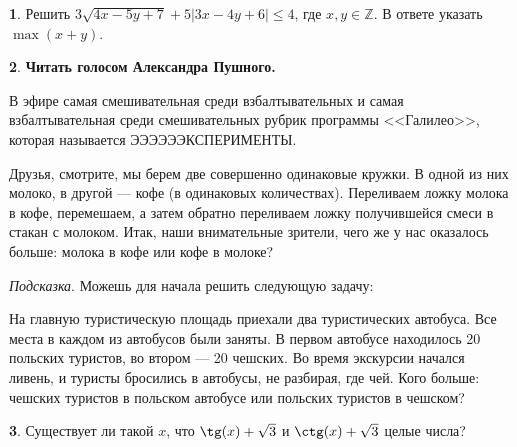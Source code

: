 \documentclass[14pt, a4paper]{extarticle}
\theoremstyle{definition}
\newtheorem{problem}{}
\theoremstyle{definition}
\theoremstyle{remark}
\numberwithin{equation}{section}
\newcommand{\Z}{\ensuremath{\mathbb{Z}}}
\begin{document}
\begin{problem}
    Решить $3\sqrt{4x - 5y + 7} +
    5|3x - 4y + 6| \leqslant 4$, где $x, y \in \Z$.
    В ответе указать $\max(x+y)$.
\end{problem}

\begin{problem}
    \textbf{Читать голосом Александра Пушного.}

    В эфире самая смешивательная среди взбалтывательных и самая
    взбалтывательная среди смешивательных рубрик программы <<Галилео>>, 
    которая называется ЭЭЭЭЭЭКСПЕРИМЕНТЫ.
    
    Друзья, смотрите, мы берем две совершенно одинаковые кружки.
    В одной из них молоко, в другой --- кофе (в одинаковых количествах). 
    Переливаем ложку молока в кофе, перемешаем, 
    а затем обратно переливаем ложку получившейся смеси в стакан с молоком. 
    Итак, наши внимательные зрители, чего же у нас оказалось больше:
    молока в кофе или кофе в молоке?

    \textit{Подсказка}. Можешь для начала решить следующую задачу:

    На главную туристическую площадь приехали два туристических 
    автобуса. Все места в каждом из автобусов были заняты. 
    В первом автобусе находилось 20 польских 
    туристов, во втором --- 20 чешских. Во время экскурсии 
    начался ливень, и туристы бросились в автобусы, не разбирая, где чей. 
    Кого больше: чешских туристов в польском автобусе или польских 
    туристов в чешском?
\end{problem}

\begin{problem}
    Существует ли такой $x$, что $\tg(x) + \sqrt{3}$ и 
    $\ctg(x) + \sqrt{3}$ целые числа?
\end{problem}
\end{document}

